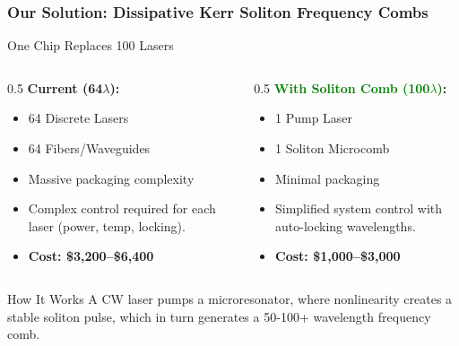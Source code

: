 \documentclass{beamer}
\begin{document}
\begin{frame}[fragile]
    \frametitle{Our Solution: Dissipative Kerr Soliton Frequency Combs}
    
    \begin{block}{One Chip Replaces 100 Lasers}
        \begin{columns}[T]
            \begin{column}{0.5\textwidth}
                \textbf{\alert{Current (64$\lambda$)}:}
                \begin{itemize}
                    \item 64 Discrete Lasers
                    \item 64 Fibers/Waveguides
                    \item Massive packaging complexity
                    \item Complex control required for each laser (power, temp, locking).
                    \item \textbf{Cost: \$3,200--\$6,400}
                \end{itemize}
            \end{column}
            \begin{column}{0.5\textwidth}
                \textbf{\textcolor{green}{With Soliton Comb (100$\lambda$)}:}
                \begin{itemize}
                    \item 1 Pump Laser
                    \item 1 Soliton Microcomb
                    \item Minimal packaging
                    \item Simplified system control with auto-locking wavelengths.
                    \item \textbf{Cost: \$1,000--\$3,000}
                \end{itemize}
            \end{column}
        \end{columns}
    \end{block}

    \begin{exampleblock}{How It Works}
        A CW laser pumps a microresonator, where nonlinearity creates a stable soliton pulse, which in turn generates a 50-100+ wavelength frequency comb.
    \end{exampleblock}
\end{frame}
\end{document}
